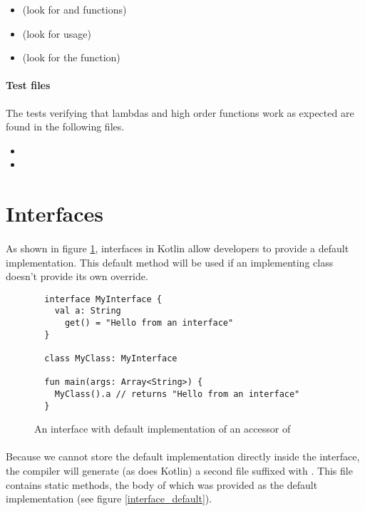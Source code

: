 \begin{itemize}
 \item {} (look for  and 
 functions)
 \item {} (look for  usage)
 \item {} (look for the  function)
\end{itemize}

\paragraph{Test files} The tests verifying that lambdas and high order functions work as expected 
are found in the following files.

\begin{itemize}
 \item {}
 \item {}
\end{itemize}

\section{Interfaces} \label{interfaces}

\paragraph{} As shown in figure \ref{interface_decl}, interfaces in Kotlin allow developers to 
provide a default implementation. This default method will be used if an implementing class
doesn't provide its own override. 

\begin{figure}[h!]
  \begin{verbatim}
  interface MyInterface {
    val a: String
      get() = "Hello from an interface"
  }
  
  class MyClass: MyInterface
  
  fun main(args: Array<String>) {
    MyClass().a // returns "Hello from an interface"
  }
  \end{verbatim}
  \caption{An interface with default implementation of an accessor of }
  \label{interface_decl}
\end{figure}

\paragraph{} Because we cannot store the default implementation directly inside the interface, the 
compiler will generate (as does Kotlin) a second file suffixed with . This 
file contains static methods, the body of which was provided as the default implementation (see 
figure \ref{interface_default}).


